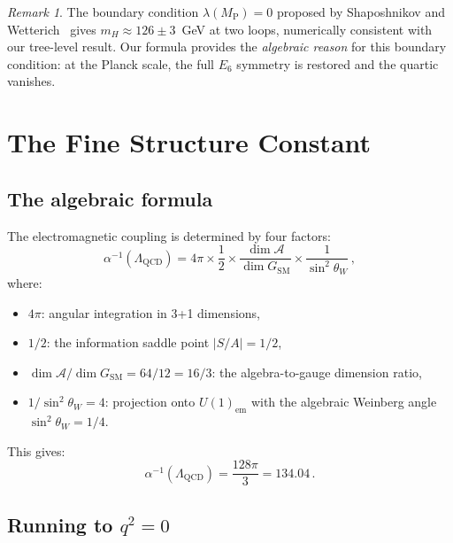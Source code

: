 \documentclass[12pt,a4paper]{article}
\theoremstyle{definition}
\theoremstyle{remark}
\newtheorem{remark}[theorem]{Remark}
\newcommand{\Alg}{\mathcal{A}}
\newcommand{\MP}{M_{\mathrm{P}}}
\begin{document}
\begin{remark}
The boundary condition $\lambda(\MP) = 0$ proposed by 
Shaposhnikov and Wetterich~\cite{Shaposhnikov2010} gives $m_H \approx 126\pm 3$~GeV 
at two loops, numerically consistent with our tree-level result. Our formula 
provides the \emph{algebraic reason} for this boundary condition: at the 
Planck scale, the full $E_6$ symmetry is restored and the quartic vanishes.
\end{remark}

\section{The Fine Structure Constant}
\label{sec:alpha}

\subsection{The algebraic formula}

The electromagnetic coupling is determined by four factors:
\begin{equation}
\alpha^{-1}(\Lambda_{\text{QCD}}) = 4\pi \times \frac{1}{2} 
\times \frac{\dim\Alg}{\dim G_{\text{SM}}} 
\times \frac{1}{\sin^2\theta_W}\,,
\end{equation}
where:
\begin{itemize}
\item $4\pi$: angular integration in 3+1 dimensions,
\item $1/2$: the information saddle point $|S/A| = 1/2$,
\item $\dim\Alg/\dim G_{\text{SM}} = 64/12 = 16/3$: the algebra-to-gauge 
dimension ratio,
\item $1/\sin^2\theta_W = 4$: projection onto $U(1)_{\text{em}}$ with the 
algebraic Weinberg angle $\sin^2\theta_W = 1/4$.
\end{itemize}
This gives:
\begin{equation}
\alpha^{-1}(\Lambda_{\text{QCD}}) = \frac{128\pi}{3} = 134.04\,.
\end{equation}

\subsection{Running to $q^2 = 0$}
\end{document}
